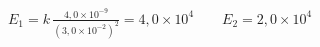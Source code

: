 \documentclass[preview,border=1pt,12pt]{standalone}
\begin{document}
$\displaystyle E_1 = k\,\frac{4{,}0 \times 10^{-9}}{(3{,}0 \times 10^{-2})^{2}} = 4{,}0 \times 10^{4} \qquad E_2 = 2{,}0 \times 10^{4}$
\end{document}
